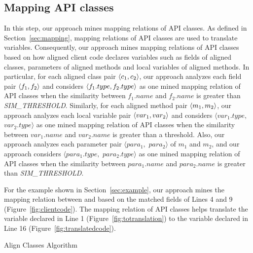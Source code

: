 \subsection{Mapping API classes}
\label{sec:approach:mappingtypes} 

In this step, our approach mines mapping relations of 
API classes. As defined in Section~\ref{sec:mapping}, mapping relations of API classes are used
to translate variables. Consequently, our approach mines mapping
relations of API classes based on how aligned client code declares
variables such as fields of aligned classes, parameters of aligned methods
and local variables of aligned methods. In
particular, for each aligned class pair $\langle c_1, c_2 \rangle$, our
approach analyzes each field pair $\langle f_1, f_2 \rangle$ and considers
$\langle f_1.type, f_2.type \rangle$ as one mined mapping relation of API
classes when the similarity between $f_1.name$ and $f_2.name$ is
greater than \emph{SIM\_THRESHOLD}. Similarly, for each aligned method pair
$\langle m_1, m_2 \rangle$, our approach analyzes each local variable pair
$\langle var_1, var_2 \rangle$ and considers $\langle var_1.type,$ $
var_2.type\rangle$ as one mined mapping relation of API classes when
the similarity between $var_1.name$ and $var_2.name$ is greater than
a threshold. Also, our approach analyzes each parameter pair
$\langle para_1, $ $para_2\rangle$ of $m_1$ and $m_2$, and our
approach considers $\langle para_1.type,$ $para_2.type\rangle$ as
one mined mapping relation of API classes when the similarity
between $para_1.name$ and $para_2.name$ is greater than \emph{SIM\_THRESHOLD}.

For the example shown in Section~\ref{sec:example}, our approach
mines the mapping relation between  and
 based on the matched fields of Lines 4
and 9 (Figure~\ref{fig:clientcode}). The mapping relation of API classes helps translate the
variable declared in Line 1 (Figure~\ref{fig:totranslation}) 
to the variable declared in Line 16 (Figure~\ref{fig:translatedcode}).

\begin{algorithm}[t]
\begin{SmallOut}
\dontprintsemicolon
\end{SmallOut}
\label{alg:alignclasses} \caption{Align Classes Algorithm}
\end{algorithm}

